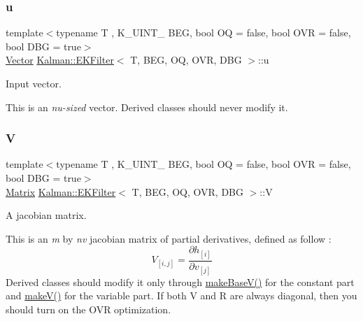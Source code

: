 \subsubsection{\texorpdfstring{u}{u}}
{\footnotesize\ttfamily template$<$typename T , K\+\_\+\+U\+I\+N\+T\+\_ B\+EG, bool OQ = false, bool O\+VR = false, bool D\+BG = true$>$ \\
\mbox{\hyperlink{classKalman_1_1EKFilter_af773d1217ecb01925b857d49b32bc636}{Vector}} \mbox{\hyperlink{classKalman_1_1EKFilter}{Kalman\+::\+E\+K\+Filter}}$<$ T, B\+EG, OQ, O\+VR, D\+BG $>$\+::u\hspace{0.3cm}{\ttfamily [protected]}}



Input vector. 

This is an {\itshape nu-\/sized} vector. Derived classes should never modify it. \mbox{\label{classKalman_1_1EKFilter_a9289999f22782549b25b67c4ae81b1c5}} 
\subsubsection{\texorpdfstring{V}{V}}
{\footnotesize\ttfamily template$<$typename T , K\+\_\+\+U\+I\+N\+T\+\_ B\+EG, bool OQ = false, bool O\+VR = false, bool D\+BG = true$>$ \\
\mbox{\hyperlink{classKalman_1_1EKFilter_a7cbc4cb4d9139a7f241b27110426af43}{Matrix}} \mbox{\hyperlink{classKalman_1_1EKFilter}{Kalman\+::\+E\+K\+Filter}}$<$ T, B\+EG, OQ, O\+VR, D\+BG $>$\+::V\hspace{0.3cm}{\ttfamily [protected]}}



A jacobian matrix. 

This is an {\itshape m} by {\itshape nv} jacobian matrix of partial derivatives, defined as follow \+: \[ V_{[i,j]} = \frac{\partial h_{[i]}}{\partial v_{[j]}} \] Derived classes should modify it only through {\ttfamily \mbox{\hyperlink{classKalman_1_1EKFilter_a72e6e032ae5db155eb7d1ba1401db9be}{make\+Base\+V()}}} for the constant part and {\ttfamily \mbox{\hyperlink{classKalman_1_1EKFilter_a70bb019d226cbf9858954b81c89392a7}{make\+V()}}} for the variable part. If both V and R are always diagonal, then you should turn on the {\ttfamily O\+VR} optimization. \mbox{\label{classKalman_1_1EKFilter_a3a50c13fef614d595d01afa70184db84}} 
